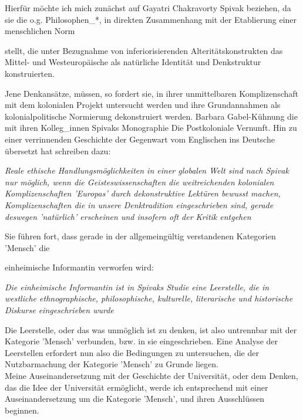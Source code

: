 Hierfür möchte ich mich zunächst auf Gayatri Chakravorty Spivak beziehen, da
sie die o.g. Philosophen\_*, in direkten Zusammenhang mit der Etablierung einer
\glqq menschlichen Norm \grqq \footnotemark {}

stellt, die unter Bezugnahme von \glqq inferiorisierenden Alteritätskonstrukten
\grqq das Mittel- und Westeuropäische als natürliche Identität und Denkstruktur
konstruierten. 

Jene Denkansätze, müssen, so fordert sie, in ihrer unmittelbaren
Komplizenschaft mit dem kolonialen Projekt untersucht werden und ihre
Grundannahmen als kolonialpolitische Normierung dekonstruiert werden.
\footnotemark {}
Barbara Gabel-Kühnung die mit ihren Kolleg\_innen Spivaks Monographie \glqq Die Postkoloniale Vernunft. Hin zu einer verrinnenden
Geschichte der Gegenwart \grqq \footnotemark {} vom Englischen ins Deutsche übersetzt hat schreiben dazu: 
\begin{myenv} 
  \textit{ \glqq Reale ethische
  Handlungsmöglichkeiten in einer globalen Welt sind nach Spivak nur möglich,
wenn die Geisteswissenschaften die weitreichenden kolonialen Komplizenschaften
'Europas' durch dekonstruktive Lektüren bewusst machen, Komplizenschaften die
in unsere Denktradition eingeschrieben sind, gerade deswegen 'natürlich'
erscheinen und insofern oft der Kritik entgehen \grqq \footnotemark
{}} 
\end{myenv} 
Sie führen fort, dass gerade in der allgemeingültig verstandenen Kategorien 'Mensch' die

\glqq einheimische Informantin \grqq verworfen wird:
\begin{myenv} \textit{
    \glqq Die einheimische Informantin ist in Spivaks Studie eine Leerstelle,
die in westliche ethnographische, philosophische, kulturelle, literarische und
historische Diskurse eingeschrieben wurde \grqq \footnotemark {}} 
\end{myenv}

Die Leerstelle, oder das was unmöglich ist zu denken, ist also untrennbar mit
der Kategorie 'Mensch' verbunden, bzw. in sie eingeschrieben. Eine Analyse der
Leerstellen erfordert nun also die Bedingungen zu untersuchen, die der
Nutzbarmachung der Kategorie 'Mensch' zu Grunde liegen. \\
Meine Auseinandersetzung mit
der Geschichte der Universität, oder dem Denken, das die Idee der Universität
ermöglicht, werde ich entsprechend mit einer Auseinandersetzung um die
Kategorie 'Mensch', und ihren Ausschlüssen beginnen. 

